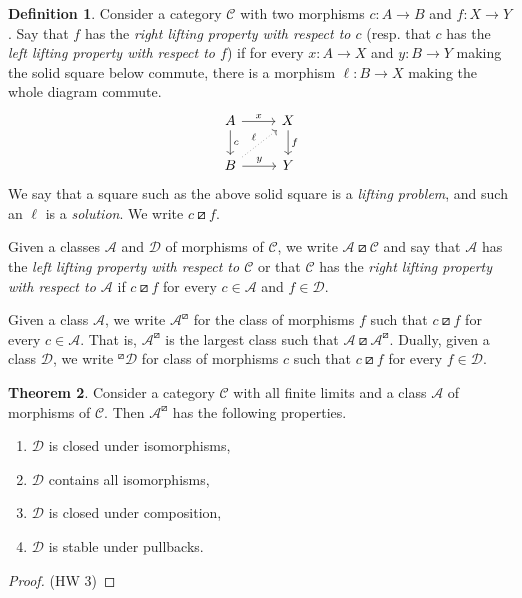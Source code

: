 \documentclass{article}
\theoremstyle{definition}
\newtheorem{definition}{Definition}[section]
\newtheorem{theorem}[definition]{Theorem}
\newcommand{\C}{\mathcal C}
\newcommand{\D}{\mathcal D}
\newcommand{\A}{\mathcal A}
\begin{document}
\begin{definition}
    Consider a category $\C$ with two morphisms $c: A \to B$ and $f: X \to Y$. Say that $f$ has the \emph{right lifting property with respect to $c$} (resp. that $c$ has the \emph{left lifting property with respect to $f$}) if for every $x : A \to X$ and $y : B \to Y$ making the solid square below commute, there is a morphism $\ell: B \to X$ making the whole diagram commute.
    \[
         \begin{tikzcd}
             A \ar[r,"x"] \ar[d,"c"] & X \ar[d,"f"]
             \\ 
             B \ar[r,"y"] \ar[ur,"\ell",dotted] & Y
         \end{tikzcd}
    \]
    We say that a square such as the above solid square is a \emph{lifting problem}, and such an $\ell$ is a \emph{solution}. We write $c \boxslash f$.

    Given a classes $\A$ and $\D$ of morphisms of $\C$, we write $\A \boxslash \C$ and say that $\A$ has the \emph{left lifting property with respect to $\C$} or that $\C$ has the \emph{right lifting property with respect to $\A$} if $c \boxslash f$ for every $c \in \A$ and $f \in \D$.

    Given a class $\A$, we write $\A^\boxslash$ for the class of morphisms $f$ such that $c \boxslash f$ for every $c \in \A$. That is, $\A^\boxslash$ is the largest class such that $\A \boxslash \A^\boxslash$. Dually, given a class $\D$, we write $^\boxslash \D$ for class of morphisms $c$ such that $c \boxslash f$ for every $f \in \D$.
\end{definition}

\begin{theorem}
    \label{thm:saturation}
    Consider a category $\C$ with all finite limits and a class $\A$ of morphisms of $\C$. Then $\A^\boxslash$ has the following properties.
    \begin{enumerate}
        \item $\D$ is closed under isomorphisms,
        \item $\D$ contains all isomorphisms,
        \item $\D$ is closed under composition,
        \item $\D$ is stable under pullbacks.
    \end{enumerate}
\end{theorem}
\begin{proof}
    (HW 3)
\end{proof}
\end{document}
